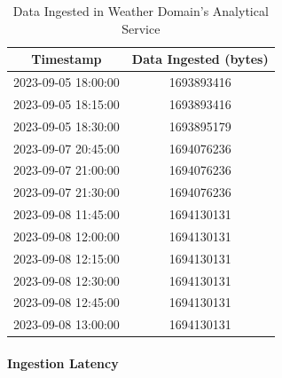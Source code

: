 \documentclass{ieeeaccess}
\begin{document}
\begin{table}[ht]

  \centering

  \caption{Data Ingested in Weather Domain's Analytical Service}

  \begin{tabular}{|c|c|}

  \hline

  \textbf{Timestamp} & \textbf{Data Ingested (bytes)} \\

  \hline

  2023-09-05 18:00:00 & 1693893416 \\

  2023-09-05 18:15:00 & 1693893416 \\

  2023-09-05 18:30:00 & 1693895179 \\

  2023-09-07 20:45:00 & 1694076236 \\

  2023-09-07 21:00:00 & 1694076236 \\

  2023-09-07 21:30:00 & 1694076236 \\

  2023-09-08 11:45:00 & 1694130131 \\

  2023-09-08 12:00:00 & 1694130131 \\

  2023-09-08 12:15:00 & 1694130131 \\

  2023-09-08 12:30:00 & 1694130131 \\

  2023-09-08 12:45:00 & 1694130131 \\

  2023-09-08 13:00:00 & 1694130131 \\

  \hline

  \end{tabular}

  \label{dataIngestedInWeatherDomainAnalyticalServiceTable}

\end{table}

\paragraph{Ingestion Latency}
\end{document}
